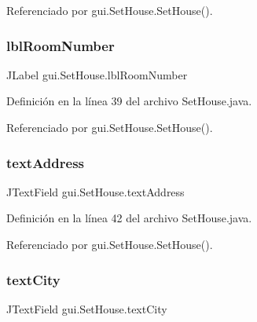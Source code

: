 Referenciado por gui.\+Set\+House.\+Set\+House().

\mbox{\label{classgui_1_1_set_house_a56c1015ff2ee4e195c0ab8af428b438e}} 
\subsubsection{\texorpdfstring{lblRoomNumber}{lblRoomNumber}}
{\footnotesize\ttfamily J\+Label gui.\+Set\+House.\+lbl\+Room\+Number\hspace{0.3cm}{\ttfamily [private]}}



Definición en la línea 39 del archivo Set\+House.\+java.



Referenciado por gui.\+Set\+House.\+Set\+House().

\mbox{\label{classgui_1_1_set_house_aa98697a65302143d8d090c3593fd4f86}} 
\subsubsection{\texorpdfstring{textAddress}{textAddress}}
{\footnotesize\ttfamily J\+Text\+Field gui.\+Set\+House.\+text\+Address\hspace{0.3cm}{\ttfamily [private]}}



Definición en la línea 42 del archivo Set\+House.\+java.



Referenciado por gui.\+Set\+House.\+Set\+House().

\mbox{\label{classgui_1_1_set_house_ac7f5a3fa4bb474d1ef8949df7c1a1395}} 
\subsubsection{\texorpdfstring{textCity}{textCity}}
{\footnotesize\ttfamily J\+Text\+Field gui.\+Set\+House.\+text\+City\hspace{0.3cm}{\ttfamily [private]}}



